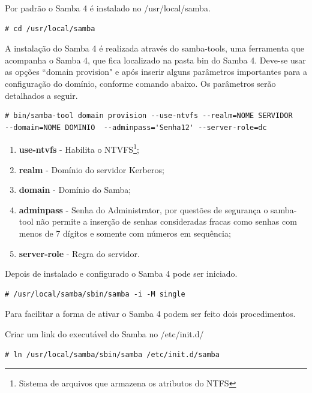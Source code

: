 Por padrão o Samba 4 é instalado no /usr/local/samba.\\

\begin{lstlisting}
# cd /usr/local/samba
\end{lstlisting}

A instalação do Samba 4 é realizada através do samba-tools, uma ferramenta que acompanha o Samba 4, que fica localizado na pasta bin do Samba 4. Deve-se usar as opções ``domain provision" e após inserir alguns parâmetros importantes para a configuração do domínio, conforme comando abaixo. Os parâmetros serão detalhados a seguir.\\

\begin{lstlisting}
# bin/samba-tool domain provision --use-ntvfs --realm=NOME SERVIDOR
--domain=NOME DOMINIO  --adminpass='Senha12' --server-role=dc
\end{lstlisting}

\begin{enumerate}
	\item \textbf{use-ntvfs} - Habilita o NTVFS\footnote[3]{Sistema de arquivos que armazena os atributos do NTFS};
	\item \textbf{realm} - Domínio do servidor Kerberos;
	\item \textbf{domain} - Domínio do Samba;
	\item \textbf{adminpass} - Senha do Administrator, por questões de segurança o samba-tool não permite a inserção de senhas consideradas fracas como senhas com menos de 7 dígitos e somente com números em sequência;
	\item \textbf{server-role} - Regra do servidor.
\end{enumerate}

Depois de instalado e configurado o Samba 4 pode ser iniciado.\\

\begin{lstlisting}
# /usr/local/samba/sbin/samba -i -M single
\end{lstlisting}

Para facilitar a forma de ativar o Samba 4 podem ser feito dois procedimentos.

Criar um link do executável do Samba no /etc/init.d/\\

\begin{lstlisting}
# ln /usr/local/samba/sbin/samba /etc/init.d/samba
\end{lstlisting}

